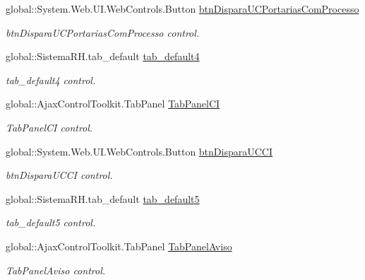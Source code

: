 \begin{DoxyCompactItemize}
global::System.Web.UI.WebControls.Button \hyperlink{class_sistema_r_h_1_1_cadastro_docs_a02b00ab22821e0f99d60c628b6d12d7e}{btnDisparaUCPortariasComProcesso}
\begin{DoxyCompactList}\small\item\em btnDisparaUCPortariasComProcesso control. \item\end{DoxyCompactList}\item 
global::SistemaRH.tab\_\-default \hyperlink{class_sistema_r_h_1_1_cadastro_docs_a55a5a3ad3248d1048b0f0ea60012059c}{tab\_\-default4}
\begin{DoxyCompactList}\small\item\em tab\_\-default4 control. \item\end{DoxyCompactList}\item 
global::AjaxControlToolkit.TabPanel \hyperlink{class_sistema_r_h_1_1_cadastro_docs_af60edc8050fb84b1efce0e996bd0232d}{TabPanelCI}
\begin{DoxyCompactList}\small\item\em TabPanelCI control. \item\end{DoxyCompactList}\item 
global::System.Web.UI.WebControls.Button \hyperlink{class_sistema_r_h_1_1_cadastro_docs_af2bb49d67866ad385a6f806a07ccd59a}{btnDisparaUCCI}
\begin{DoxyCompactList}\small\item\em btnDisparaUCCI control. \item\end{DoxyCompactList}\item 
global::SistemaRH.tab\_\-default \hyperlink{class_sistema_r_h_1_1_cadastro_docs_a5012be717fd91c8991567529203d4c50}{tab\_\-default5}
\begin{DoxyCompactList}\small\item\em tab\_\-default5 control. \item\end{DoxyCompactList}\item 
global::AjaxControlToolkit.TabPanel \hyperlink{class_sistema_r_h_1_1_cadastro_docs_a386a760852dcd8ea7a3e45918086593f}{TabPanelAviso}
\begin{DoxyCompactList}\small\item\em TabPanelAviso control. \item\end{DoxyCompactList}\item 

\end{DoxyCompactItemize}
